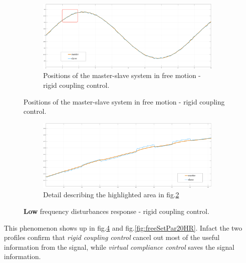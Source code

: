 \begin{figure}[H]
	\begin{subfigure}{1\linewidth}
		\centering
		\includegraphics[width=\textwidth, height=0.48\textwidth]{Images/freerigidTot20HtznoiseRect}
		\caption{Positions of the master-slave system in free motion - rigid coupling control.}
		\label{fig:freeRigTot20HR}
	\end{subfigure}	
\end{figure}
\begin{figure}[H]\ContinuedFloat
	\begin{subfigure}{1\linewidth}
		\centering
		\includegraphics[width=\textwidth, height=0.48\textwidth]{Images/freerigidPart20Htznoise}
		\caption{Detail describing the highlighted area in fig.\ref{fig:freeRigTot20HR}}
		\label{fig:freeRigPar20HR}
	\end{subfigure}	
 \caption{\textbf{Low} frequency disturbances response - rigid coupling control.}
\end{figure}

This phenomenon shows up in fig.\ref{fig:freeRigPar20HR} and fig.\ref{fig:freeSetPar20HR}. Infact the two profiles confirm that \textsl{rigid coupling control} cancel out most of the useful information from the signal, while \textsl{virtual compliance control} saves the signal information.

